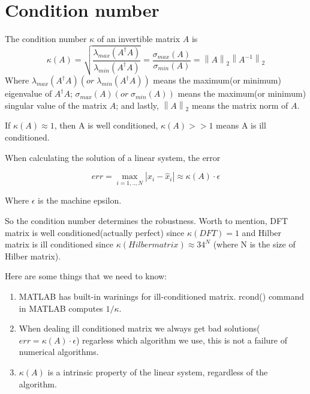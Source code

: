 	
	\section{Condition number}
	
	\begin{definition}
		The condition number $\kappa$ of an invertible matrix $A$ is 	
		\[\kappa(A) = \sqrt{\frac{\lambda_{max}(A^\dagger A)}{\lambda_{min}(A^\dagger A)}}
		= \frac{\sigma_{max}(A)}{\sigma_{min}(A)}
		= \left\| A \right\|_2 \left\| A^{-1} \right\|_2\]
	Where $\lambda_{max}(A^\dagger A) (or\;\lambda_{min}(A^\dagger A))$ means the maximum(or minimum) eigenvalue of $A^\dagger A$; $\sigma_{max}(A) (or\;\sigma_{min}(A))$ means the maximum(or minimum) singular value of the matrix $A$; and lastly, $\left\| A \right\|_2$ means the matrix norm of $A$.
	
	If $\kappa(A)\approx 1$, then A is well conditioned, $\kappa(A) >> 1$ means A is ill conditioned. 
	\end{definition}
	
	\begin{thm}
		When calculating the solution of a linear system, the error
		
		\[err = \underset{{i=1,..,N}}{\max} |x_i - \hat{x}_i| \approx \kappa(A)\cdot\epsilon \]
		
		Where $\epsilon$ is the machine epsilon.
	\end{thm}

	So the condition number determines the robustness.
	Worth to mention, DFT matrix is well conditioned(actually perfect) since $\kappa(DFT) = 1$ and Hilber matrix is ill conditioned since $\kappa(Hilber matrix) \approx 34^N$ (where N is the size of Hilber matrix).
	
	\begin{summary}
		Here are some things that we need to know: 
		\begin{enumerate}
			\item MATLAB has built-in warinings for ill-conditioned matrix. rcond() command in MATLAB computes $1/\kappa$.
			
			\item When dealing ill conditioned matrix we always get bad solutions($err = \kappa(A)\cdot\epsilon$) regarless which algorithm we use, this is not a failure of numerical algorithms.
			
			\item $\kappa(A)$ is a intrinsic property of the linear system, regardless of the algorithm.
		\end{enumerate}     
	\end{summary}
	 
